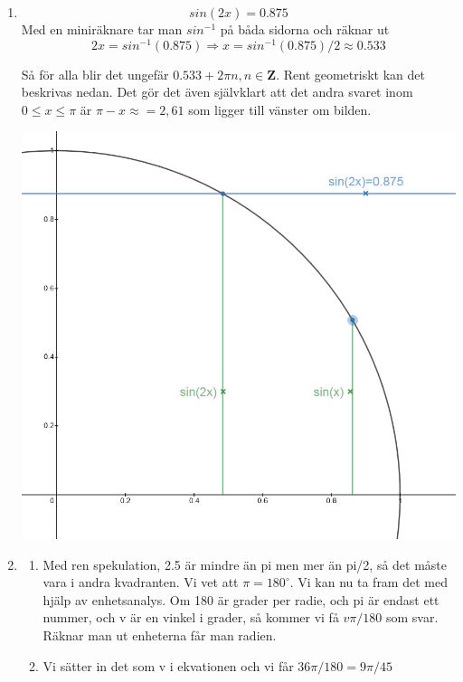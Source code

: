 \documentclass[a4paper,12pt]{article}
\begin{document}
\begin{enumerate}
    \item $$sin(2x)=0.875$$
          Med en miniräknare tar man $sin^{-1}$ på båda sidorna och räknar ut
          $$2x=sin^{-1}(0.875)\Rightarrow x=sin^{-1}(0.875)/2\approx 0.533$$

          Så för alla blir det ungefär $0.533+2\pi n, n\in \mathbf{Z}$.
          Rent geometriskt kan det beskrivas nedan.
          Det gör det även självklart
          att det andra svaret inom $0 \leq x \leq \pi$ är $\pi-x\approx=2,61$ som ligger till vänster om bilden.

          \includegraphics[scale=0.45]{Figur1.png}

    \item
          \begin{enumerate}
              \item Med ren spekulation, 2.5 är mindre än pi men mer än pi/2, så det måste vara i andra kvadranten.
                    Vi vet att $\pi=180^\circ $. Vi kan nu ta fram det med
                    hjälp av enhetsanalys. Om 180 är grader per radie, och pi är endast ett nummer, och v är en vinkel
                    i grader, så kommer vi få $v\pi / 180$ som svar. Räknar man ut enheterna får man radien.

              \item Vi sätter in det som v i ekvationen och vi får $36\pi / 180 = 9 \pi/ 45$
          \end{enumerate}


\end{enumerate}
\end{document}
